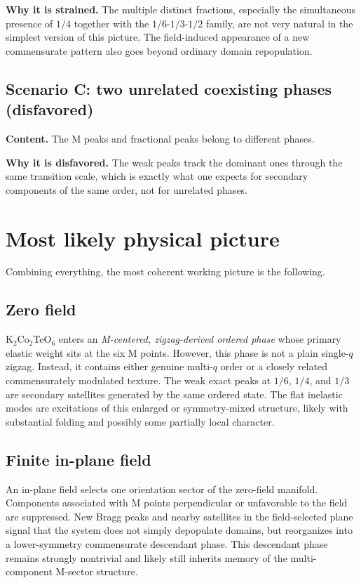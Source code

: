 \documentclass[11pt]{article}
\begin{document}
\textbf{Why it is strained.} The multiple distinct fractions, especially the simultaneous presence of \(1/4\) together with the \(1/6\)-\(1/3\)-\(1/2\) family, are not very natural in the simplest version of this picture. The field-induced appearance of a new commensurate pattern also goes beyond ordinary domain repopulation.

\subsection*{Scenario C: two unrelated coexisting phases \hfill (disfavored)}

\textbf{Content.} The M peaks and fractional peaks belong to different phases.

\textbf{Why it is disfavored.} The weak peaks track the dominant ones through the same transition scale, which is exactly what one expects for secondary components of the same order, not for unrelated phases.

\section{Most likely physical picture}

Combining everything, the most coherent working picture is the following.

\subsection*{Zero field}

K$_2$Co$_2$TeO$_6$ enters an \emph{M-centered, zigzag-derived ordered phase} whose primary elastic weight sits at the six M points. However, this phase is not a plain single-$q$ zigzag. Instead, it contains either genuine multi-$q$ order or a closely related commensurately modulated texture. The weak exact peaks at \(1/6\), \(1/4\), and \(1/3\) are secondary satellites generated by the same ordered state. The flat inelastic modes are excitations of this enlarged or symmetry-mixed structure, likely with substantial folding and possibly some partially local character.

\subsection*{Finite in-plane field}

An in-plane field selects one orientation sector of the zero-field manifold. Components associated with M points perpendicular or unfavorable to the field are suppressed. New Bragg peaks and nearby satellites in the field-selected plane signal that the system does not simply depopulate domains, but reorganizes into a lower-symmetry commensurate descendant phase. This descendant phase remains strongly nontrivial and likely still inherits memory of the multi-component M-sector structure.
\end{document}
